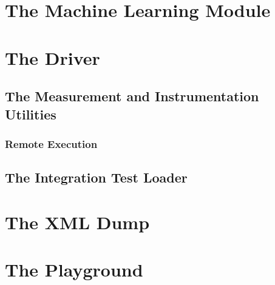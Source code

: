 \section{The Machine Learning Module}

\section{The Driver}
\subsection{The Measurement and Instrumentation Utilities}
\subsubsection{Remote Execution}
\subsection{The Integration Test Loader}

\section{The XML Dump}
\section{The Playground}
